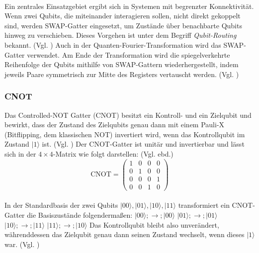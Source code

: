 \\
Ein zentrales Einsatzgebiet ergibt sich in Systemen mit begrenzter Konnektivität. Wenn zwei Qubits, die miteinander interagieren sollen, nicht direkt gekoppelt sind, werden SWAP-Gatter eingesetzt, um Zustände über benachbarte Qubits hinweg zu verschieben. Dieses Vorgehen ist unter dem Begriff \emph{Qubit-Routing} bekannt. (Vgl. \cite[S.2f.]{molavi_qubit_2022}) Auch in der Quanten-Fourier-Transformation wird das SWAP-Gatter verwendet. Am Ende der Transformation wird die spiegelverkehrte Reihenfolge der Qubits mithilfe von SWAP-Gattern wiederhergestellt, indem jeweils Paare symmetrisch zur Mitte des Registers vertauscht werden. (Vgl. \cite[S.219]{nielsen_quantum_2010})


\subsubsection{CNOT}\label{subsec:cnot_gatter}
Das Controlled-NOT Gatter (CNOT) besitzt ein Kontroll- und ein Zielqubit und bewirkt, dass der Zustand des Zielqubits genau dann mit einem Pauli-X (Bitflipping, dem klassischen NOT) invertiert wird, wenn das Kontrollqubit im Zustand $|1\rangle$ ist. (Vgl. \cite[S.20f., 177f.]{nielsen_quantum_2010}) Der CNOT-Gatter ist unitär und invertierbar und lässt sich in der $4\times 4$-Matrix wie folgt darstellen: (Vgl. ebd.) \\
\begin{equation}
\text{CNOT} = \begin{pmatrix}
1 & 0 & 0 & 0 \\
0 & 1 & 0 & 0 \\
0 & 0 & 0 & 1 \\
0 & 0 & 1 & 0
\end{pmatrix}
\end{equation} \\
In der Standardbasis der zwei Qubits ${|00\rangle, |01\rangle, |10\rangle, |11\rangle}$ transformiert ein CNOT-Gatter die Basiszustände folgendermaßen:
$|00\rangle ;\to; |00\rangle$
$|01\rangle ;\to; |01\rangle$
$|10\rangle ;\to; |11\rangle$
$|11\rangle ;\to; |10\rangle$
Das Kontrollqubit bleibt also unverändert, währenddessen das Zielqubit genau dann seinen Zustand wechselt, wenn dieses $|1\rangle$ war. (Vgl. \cite[S.21]{nielsen_quantum_2010})
\\
